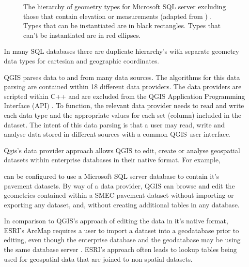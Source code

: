 \documentclass[a4paper,11pt,english]{sphinxmanual}
\begin{document}
\begin{figure}[htbp]
\centering
\capstart

\noindent{}
\caption{The hierarchy of geometry types for Microsoft SQL server excluding those that contain elevation or measurements (adapted from ) \sphinxfootnotemark[4].  Types that can be instantiated are in black rectangles.  Types that can’t be instantiated are in red ellipses.}\label{\detokenize{background:id42}}\label{\detokenize{background:figuremssqlhier}}\end{figure}
%
\begin{footnotetext}[4]\sphinxAtStartFootnote
In many SQL databases there are duplicate hierarchy’s with separate geometry data types for cartesian and geographic coordinates.
%
\end{footnotetext}\ignorespaces 
QGIS parses data to and from many data sources.  The algorithms for this data parsing are contained within 18 different data providers.  The data providers are scripted within C++ and are excluded from the QGIS Application Programming Interface (API) .  To function, the relevant data provider needs to read and write each data type and the appropriate values for each set (column) included in the dataset. The intent of this data parsing is that a user may read, write and analyse data stored in different sources with a common QGIS user interface.

Qgis’s data provider approach allows QGIS to edit, create or analyse geospatial datasets within enterprise databases in their native format.  For example, %
\begin{footnote}[3]\sphinxAtStartFootnote
{}
%
\end{footnote} can be configured to use a Microsoft SQL server database to contain it’s pavement datasets.  By way of a data provider, QGIS can browse and edit the geometries contained within a SMEC pavement dataset without importing or exporting any dataset, and, without creating additional tables in any database.

In comparison to QGIS’s approach of editing the data in it’s native format, ESRI’s ArcMap requires a user to import a dataset into a geodatabase prior to editing, even though the enterprise database and the geodatabase may be using the same database server .  ESRI’s approach often leads to lookup tables being used for geospatial data that are joined to non-spatial datasets.
\end{document}
